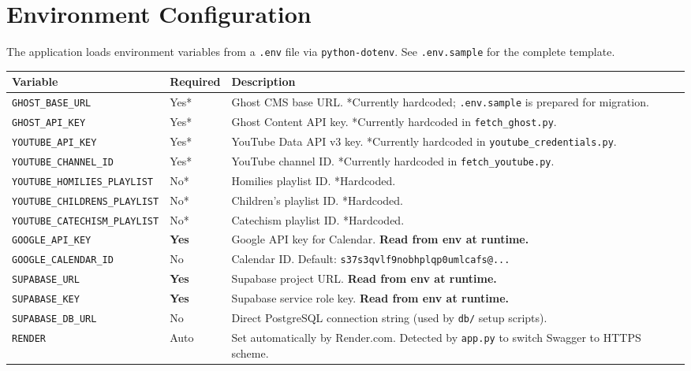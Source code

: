 \documentclass[12pt]{article}
\begin{document}
\section{Environment Configuration}

The application loads environment variables from a \texttt{.env} file via \texttt{python-dotenv}. See \texttt{.env.sample} for the complete template.

\begin{longtable}{llp{7cm}}
\toprule
\textbf{Variable} & \textbf{Required} & \textbf{Description} \\
\midrule
\endhead
\texttt{GHOST\_BASE\_URL} & Yes* & Ghost CMS base URL. *Currently hardcoded; \texttt{.env.sample} is prepared for migration. \\
\texttt{GHOST\_API\_KEY} & Yes* & Ghost Content API key. *Currently hardcoded in \texttt{fetch\_ghost.py}. \\
\texttt{YOUTUBE\_API\_KEY} & Yes* & YouTube Data API v3 key. *Currently hardcoded in \texttt{youtube\_credentials.py}. \\
\texttt{YOUTUBE\_CHANNEL\_ID} & Yes* & YouTube channel ID. *Currently hardcoded in \texttt{fetch\_youtube.py}. \\
\texttt{YOUTUBE\_HOMILIES\_PLAYLIST} & No* & Homilies playlist ID. *Hardcoded. \\
\texttt{YOUTUBE\_CHILDRENS\_PLAYLIST} & No* & Children's playlist ID. *Hardcoded. \\
\texttt{YOUTUBE\_CATECHISM\_PLAYLIST} & No* & Catechism playlist ID. *Hardcoded. \\
\texttt{GOOGLE\_API\_KEY} & \textbf{Yes} & Google API key for Calendar. \textbf{Read from env at runtime.} \\
\texttt{GOOGLE\_CALENDAR\_ID} & No & Calendar ID. Default: \texttt{s37s3qvlf9nobhplqp0umlcafs@...} \\
\texttt{SUPABASE\_URL} & \textbf{Yes} & Supabase project URL. \textbf{Read from env at runtime.} \\
\texttt{SUPABASE\_KEY} & \textbf{Yes} & Supabase service role key. \textbf{Read from env at runtime.} \\
\texttt{SUPABASE\_DB\_URL} & No & Direct PostgreSQL connection string (used by \texttt{db/} setup scripts). \\
\texttt{RENDER} & Auto & Set automatically by Render.com. Detected by \texttt{app.py} to switch Swagger to HTTPS scheme. \\
\bottomrule
\end{longtable}
\end{document}

